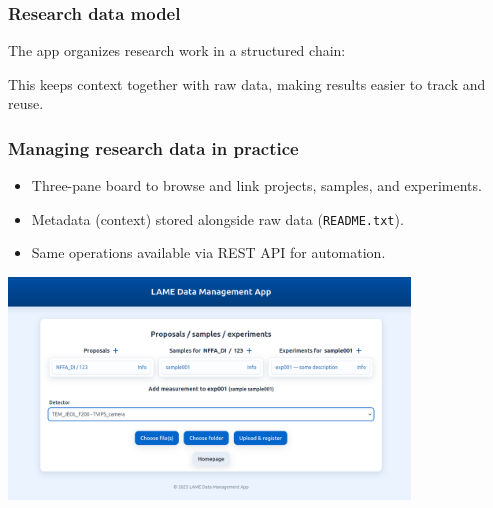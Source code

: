 \documentclass{beamer}
\begin{document}
	\begin{frame}
		\frametitle{Research data model}
		
		The app organizes research work in a structured chain:
		
		\vspace{1em}
		\centering
		
		\vspace{1em}
		\small
		This keeps context together with raw data, making results easier to track and reuse.
	\end{frame}
	
	\begin{frame}
		\frametitle{Managing research data in practice}
		
		\begin{itemize}
			\item Three-pane board to browse and link projects, samples, and experiments.
			\item Metadata (context) stored alongside raw data (\texttt{README.txt}).
			\item Same operations available via REST API for automation.
		\end{itemize}
		
		\vspace{1em}
		\centering
		\includegraphics[width=0.8\textwidth]{otherResources/ui_add_measurement.png}
	\end{frame}
	
\end{document}
